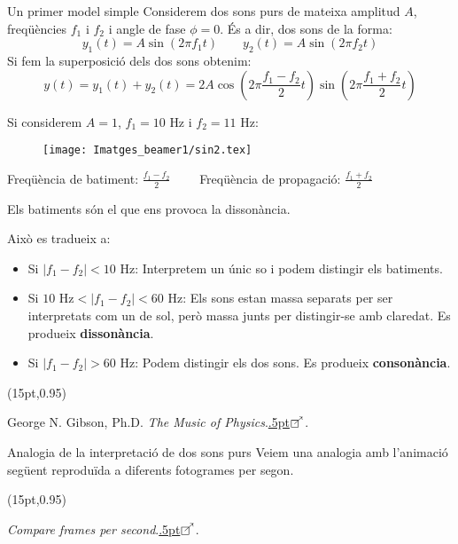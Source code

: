 \documentclass[10pt,hyperref={colorlinks,linkcolor=black,citecolor=blue,urlcolor=blue!70},handout]{beamer}
\newcommand\enllas{\raise.5pt\hbox{$\boxempty\kern-4.85pt{}^{\nearrow}$}\kern-2pt}
\newcommand\FrameText[1]{
  \begin{textblock*}{\paperwidth}(15pt,0.95\textheight)
    \tiny
    \raggedright #1\hspace{.5em}
  \end{textblock*}}
\begin{document}
\begin{frame}{Un primer model simple}
  Considerem dos sons purs de mateixa amplitud $A$, freqüències $f_1$ i $f_2$ i angle de fase $\phi=0$. És a dir, dos sons de la forma: $$y_1(t)=A\sin(2\pi f_1t)\qquad y_2(t)=A\sin(2\pi f_2t)$$\pause
  Si fem la superposició dels dos sons obtenim: $$y(t)=y_1(t)+y_2(t)=2A\cos\left(2\pi\frac{f_1-f_2}{2}t\right)\sin\left(2\pi\frac{f_1+f_2}{2}t\right)$$
\end{frame}
\begin{frame}{}
  Si considerem $A=1$, $f_1=10\text{ Hz}$ i $f_2=11\text{ Hz}$:\par\pause
  \begin{figure}
    \centering
    \texttt{[image: Imatges\_beamer1/sin2.tex]}
  \end{figure}
  Freqüència de batiment: $\frac{f_1-f_2}{2}\qquad$ Freqüència de propagació: $\frac{f_1+f_2}{2}$\par\pause
  Els batiments són el que ens provoca la dissonància.
\end{frame}
\begin{frame}{}
  Això es tradueix a:
  \begin{itemize}
    \item Si $|f_1-f_2|<10\text{ Hz}$: Interpretem un únic so i podem distingir els batiments.\pause
    \item Si $10\text{ Hz}<|f_1-f_2|<60\text{ Hz}$: Els sons estan massa separats per ser interpretats com un de sol, però massa junts per distingir-se amb claredat. Es produeix \textbf{dissonància}.\pause
    \item Si $|f_1-f_2|>60\text{ Hz}$: Podem distingir els dos sons. Es produeix \textbf{consonància}.
  \end{itemize}
  \FrameText{George N. Gibson, Ph.D. \textit{The Music of Physics}.\href{https://www.phys.uconn.edu/~gibson/Notes/Section5_5/Sec5_5.htm}{\enllas}.}
\end{frame}
\begin{frame}{Analogia de la interpretació de dos sons purs}
  Veiem una analogia amb l'animació següent reproduïda a diferents fotogrames per segon.\par
  \begin{center}
  \end{center}
  \FrameText{\textit{Compare frames per second}.\href{https://frames-per-second.appspot.com/}{\enllas}.}
\end{frame}
\end{document}
